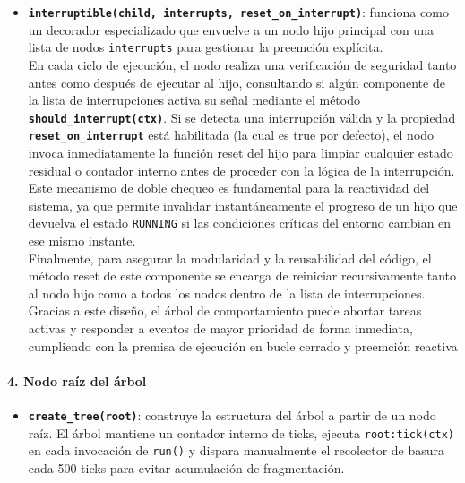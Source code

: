 \documentclass{prgrado}
\begin{document}
\begin{itemize}
\begin{itemize}
        \item \texttt{Condición de Éxito}: devuelve \texttt{SUCCESS} cuando la condición se activa y su hijo devuelve \texttt{SUCCESS}. Si no tiene hijo asignado y la condición se activa, devuelve \texttt{SUCCESS} directamente.

        \item \texttt{Memoria}: su función es evaluativa e instantánea, aunque su hijo puede tener su propia lógica interna.
    \end{itemize}
   
    \item \textbf{\texttt{interruptible(child, interrupts, reset\_on\_interrupt)}}: funciona como un decorador especializado que envuelve a un nodo hijo principal con una lista de nodos \texttt{interrupts} para gestionar la preemción explícita.\\
    En cada ciclo de ejecución, el nodo realiza una verificación de seguridad tanto antes como después de ejecutar al hijo, consultando si algún componente de la lista de interrupciones activa su señal mediante el método \textbf{\texttt{should\_interrupt(ctx)}}. Si se detecta una interrupción válida y la propiedad \textbf{\texttt{reset\_on\_interrupt}} está habilitada (la cual es true por defecto), el nodo invoca inmediatamente la función reset del hijo para limpiar cualquier estado residual o contador interno antes de proceder con la lógica de la interrupción. Este mecanismo de doble chequeo es fundamental para la reactividad del sistema, ya que permite invalidar instantáneamente el progreso de un hijo que devuelva el estado \texttt{RUNNING} si las condiciones críticas del entorno cambian en ese mismo instante. \\
    Finalmente, para asegurar la modularidad y la reusabilidad del código, el método reset de este componente se encarga de reiniciar recursivamente tanto al nodo hijo como a todos los nodos dentro de la lista de interrupciones. \\
    Gracias a este diseño, el árbol de comportamiento puede abortar tareas activas y responder a eventos de mayor prioridad de forma inmediata, cumpliendo con la premisa de ejecución en bucle cerrado y preemción reactiva
\end{itemize}

\paragraph{4. Nodo raíz del árbol}

\begin{itemize}
    \item \textbf{\texttt{create\_tree(root)}}: construye la estructura del árbol a partir de un nodo raíz. El árbol mantiene un contador interno de ticks, ejecuta \texttt{root:tick(ctx)} en cada invocación de \texttt{run()} y dispara manualmente el recolector de basura cada 500 ticks para evitar acumulación de fragmentación.
\end{itemize}
\end{document}
